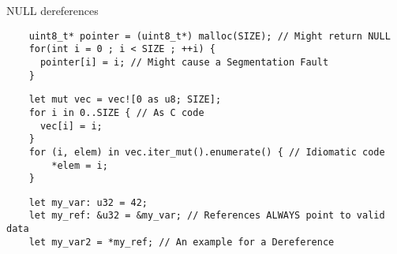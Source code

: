 \begin{frame}[fragile]{NULL dereferences}

  \begin{verbatim}
    uint8_t* pointer = (uint8_t*) malloc(SIZE); // Might return NULL
    for(int i = 0 ; i < SIZE ; ++i) {
      pointer[i] = i; // Might cause a Segmentation Fault
    }
  \end{verbatim}
    
  \begin{verbatim}
    let mut vec = vec![0 as u8; SIZE];
    for i in 0..SIZE { // As C code
      vec[i] = i;
    }
    for (i, elem) in vec.iter_mut().enumerate() { // Idiomatic code
        *elem = i;
    }
  \end{verbatim}

  \begin{verbatim}
    let my_var: u32 = 42;
    let my_ref: &u32 = &my_var; // References ALWAYS point to valid data
    let my_var2 = *my_ref; // An example for a Dereference
  \end{verbatim}


  \note{

  }
\end{frame}
